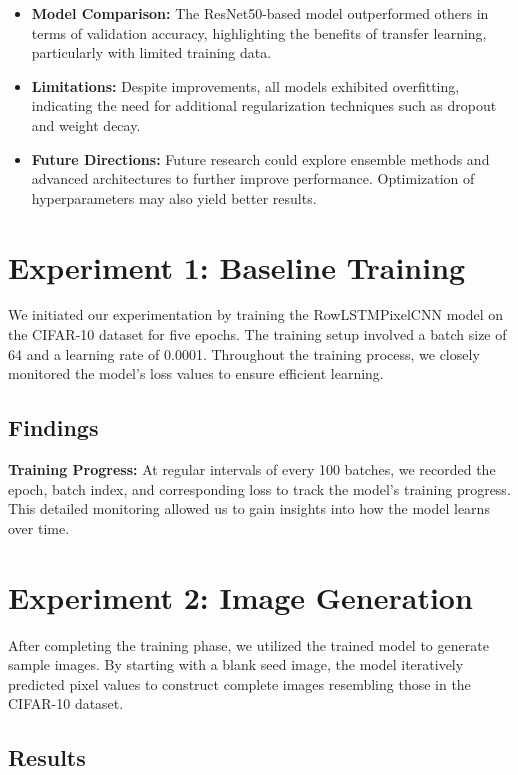 \documentclass{article}
\begin{document}
\begin{itemize}
    \item \textbf{Model Comparison:} The ResNet50-based model outperformed others in terms of validation accuracy, highlighting the benefits of transfer learning, particularly with limited training data.
    \item \textbf{Limitations:} Despite improvements, all models exhibited overfitting, indicating the need for additional regularization techniques such as dropout and weight decay.
    \item \textbf{Future Directions:} Future research could explore ensemble methods and advanced architectures to further improve performance. Optimization of hyperparameters may also yield better results.
\end{itemize}

\section{Experiment 1: Baseline Training}

We initiated our experimentation by training the RowLSTMPixelCNN model on the CIFAR-10 dataset for five epochs. The training setup involved a batch size of 64 and a learning rate of 0.0001. Throughout the training process, we closely monitored the model's loss values to ensure efficient learning.

\subsection{Findings}

\textbf{Training Progress:} At regular intervals of every 100 batches, we recorded the epoch, batch index, and corresponding loss to track the model's training progress. This detailed monitoring allowed us to gain insights into how the model learns over time.

\section{Experiment 2: Image Generation}

After completing the training phase, we utilized the trained model to generate sample images. By starting with a blank seed image, the model iteratively predicted pixel values to construct complete images resembling those in the CIFAR-10 dataset.

\subsection{Results}
\end{document}
